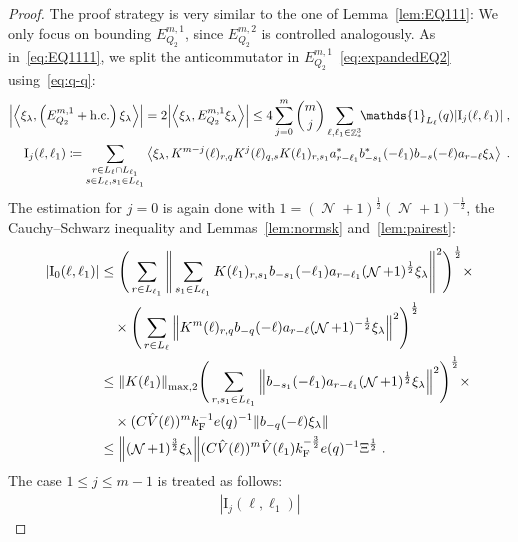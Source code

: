 \documentclass[12pt,a4paper]{article}
\numberwithin{equation}{section}
\newcommand{\1}{\mathbb{I}}
\newcommand{\F}{\mathrm{F}}
\newcommand{\I}{\mathrm{I}}
\DeclareMathOperator{\Z}{\mathbb{Z}}
\DeclareMathOperator{\NN}{\mathcal{N}}
\newcommand{\half}{\frac{1}{2}}
\newcommand{\eva}[1]{\left\langle #1 \right\rangle}
\theoremstyle{plain}
\theoremstyle{definition}
\theoremstyle{remark}
\theoremstyle{plain}
\theoremstyle{definition}
\theoremstyle{remark}
\begin{document}
\begin{proof}
The proof strategy is very similar to the one of Lemma~\ref{lem:EQ111}: We only focus on bounding $ E^{m,1}_{Q_2} $, since $ E^{m,2}_{Q_2} $ is controlled analogously.
As in~\eqref{eq:EQ1111}, we split the anticommutator in $ E^{m,1}_{Q_2} $~\eqref{eq:expandedEQ2} using~\eqref{eq:q-q}:
\begin{equation} \label{eq:EQ2111}
\begin{aligned}
	\abs{\eva{\xi_\lambda,\left(E^{m,1}_{Q_2}+\mathrm{h.c.}\right) \xi_\lambda }} 
	= 2\abs{\eva{\xi_\lambda, E^{m,1}_{Q_2} \xi_\lambda }}
	\le 4 \sum_{j=0}^m {{m}\choose j} \sum_{\ell,\ell_1 \in \Z^3_*}\!\! \mathds{1}_{L_\ell}(q) |\I_j(\ell, \ell_1)| \;,\\
	\I_j(\ell, \ell_1)
	\coloneq \sum_{\substack{r\in L_{\ell} \cap L_{\ell_1}\\ s \in L_{\ell},s_1\in L_{\ell_1}}}
		\eva{\xi_\lambda, K^{m-j}(\ell)_{r,q} K^{j}(\ell)_{q,s} K(\ell_1)_{r,s_1} a^*_{r-\ell_1} b^*_{-s_1}(-\ell_1) b_{-s}(-\ell) a_{r-\ell} \xi_\lambda} \;. \\
\end{aligned}
\end{equation}
The estimation for $ j = 0 $ is again done with $1 = (\NN+1)^{\half}(\NN+1)^{-\half}$, the Cauchy--Schwarz inequality and Lemmas~\ref{lem:normsk} and~\ref{lem:pairest}:
\begin{align}
	|\I_0(\ell, \ell_1)|
 	&\leq \Bigg( \sum_{r \in L_{\ell_1}}
 		\Bigg\Vert \sum_{s_1 \in L_{\ell_1}} K(\ell_1)_{r,s_1} b_{-s_1}(-\ell_1) a_{r-\ell_1} (\NN+1)^{\half}\xi_\lambda \Bigg\Vert^2\Bigg)^\half \times\nonumber\\
 	&\quad \times \Bigg( \sum_{r \in L_\ell} \norm{K^{m}(\ell)_{r,q} b_{-q}(-\ell) a_{r-\ell} (\NN+1)^{-\half}\xi_\lambda }^2\Bigg)^\half \nonumber\\
 	&\leq \norm{K(\ell_1)}_{\mathrm{max,2}} \Bigg(
 		\sum_{r, s_1 \in L_{\ell_1}} \norm{ b_{-s_1}(-\ell_1) a_{r-\ell_1} (\NN+1)^{\half}\xi_\lambda}^2\Bigg)^\half \times\nonumber\\
 	&\quad \times (C \hat{V}(\ell))^m k_{\F}^{-1} e(q)^{-1} \norm{b_{-q}(-\ell) \xi_\lambda } \nonumber\\
 	&\leq \norm{ (\NN+1)^{\frac{3}{2}}\xi_\lambda}
 		(C \hat{V}(\ell))^m
 		\hat{V}(\ell_1)
 		k_{\F}^{-\frac 32} e(q)^{-1} \Xi^{\half} \;. \label{eq:estEQ2111} 
\end{align}
The case $ 1 \le j \le m-1 $ is treated as follows:
\begin{align}
	|\I_j(\ell, \ell_1)|

\end{align}
\end{proof}
\end{document}
